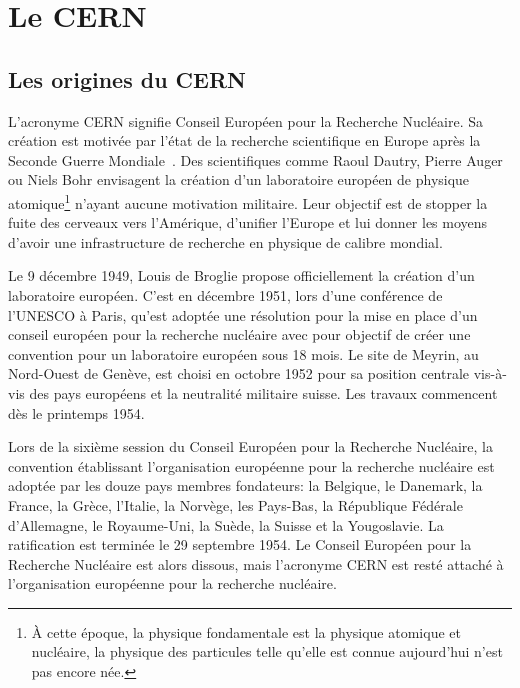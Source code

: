\section{Le CERN}\label{chapter-LHC-section-CERN}
\subsection{Les origines du CERN}
L'acronyme \og CERN \fg{} signifie Conseil Européen pour la Recherche Nucléaire.
Sa création est motivée par l'état de la recherche scientifique en Europe après la Seconde Guerre Mondiale~\cite{CERN_website}.
Des scientifiques comme Raoul Dautry, Pierre Auger ou Niels Bohr envisagent la création d'un laboratoire européen de physique atomique\footnote{À cette époque, la physique fondamentale est la physique atomique et nucléaire, la physique des particules telle qu'elle est connue aujourd'hui n'est pas encore née.} n'ayant aucune motivation militaire.
Leur objectif est de stopper la fuite des cerveaux vers l'Amérique, d'unifier l'Europe et lui donner les moyens d'avoir une infrastructure de recherche en physique de calibre mondial.
\par Le 9 décembre 1949, Louis de Broglie propose officiellement la création d'un laboratoire européen.
C'est en décembre 1951, lors d'une conférence de l'UNESCO à Paris, qu'est adoptée une résolution pour la mise en place d'un conseil européen pour la recherche nucléaire avec pour objectif de créer une convention pour un laboratoire européen sous 18 mois.
Le site de Meyrin, au Nord-Ouest de Genève, est choisi en octobre 1952 pour sa position centrale vis-à-vis des pays européens et la neutralité militaire suisse. Les travaux commencent dès le printemps 1954.
\par Lors de la sixième session du Conseil Européen pour la Recherche Nucléaire, la convention établissant l'organisation européenne pour la recherche nucléaire est adoptée par les douze pays membres fondateurs: la Belgique, le Danemark, la France, la Grèce, l'Italie, la Norvège, les Pays-Bas, la République Fédérale d'Allemagne, le Royaume-Uni, la Suède, la Suisse et la Yougoslavie.
La ratification est terminée le 29 septembre 1954.
Le Conseil Européen pour la Recherche Nucléaire est alors dissous, mais l'acronyme CERN est resté attaché à l'organisation européenne pour la recherche nucléaire.
